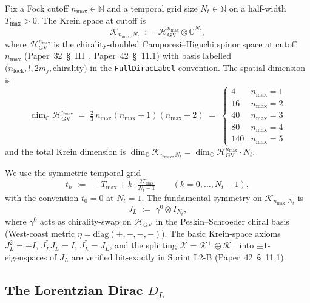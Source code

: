 \documentclass[11pt,a4paper]{article}
\theoremstyle{plain}
\theoremstyle{definition}
\newcommand{\nmax}{n_{\max}}
\newcommand{\Nt}{N_t}
\newcommand{\Krein}{\mathcal{K}}
\newcommand{\C}{\mathbb{C}}
\newcommand{\N}{\mathbb{N}}
\newcommand{\DL}{D_L}
\newcommand{\JL}{J_L}
\newcommand{\HGV}{\mathcal{H}_{\mathrm{GV}}}
\begin{document}
Fix a Fock cutoff $\nmax \in \N$ and a temporal grid size $\Nt \in
\N$ on a half-width $T_{\max} > 0$. The Krein space at cutoff is
\begin{equation}\label{eq:krein_def}
   \Krein_{\nmax, \Nt}
   \;:=\; \HGV^{\nmax} \otimes \C^{\Nt},
\end{equation}
where $\HGV^{\nmax}$ is the chirality-doubled Camporesi--Higuchi
spinor space at cutoff $\nmax$
(Paper~32~\S~III~\cite{paper32}, Paper~42~\S~11.1) with basis labelled
$\bigl(n_{\mathrm{fock}}, l, 2 m_j, \mathrm{chirality}\bigr)$ in the
\texttt{FullDiracLabel} convention. The spatial dimension is
\begin{equation}\label{eq:dim_spatial}
   \dim_\C \HGV^{\nmax}
   \;=\; \tfrac{2}{3}\,\nmax(\nmax + 1)(\nmax + 2)
   \;=\; \begin{cases} 4 & \nmax = 1 \\ 16 & \nmax = 2 \\
         40 & \nmax = 3 \\ 80 & \nmax = 4 \\ 140 & \nmax = 5 \end{cases}
\end{equation}
and the total Krein dimension is $\dim_\C \Krein_{\nmax, \Nt} =
\dim_\C \HGV^{\nmax} \cdot \Nt$.

We use the symmetric temporal grid
\begin{equation}\label{eq:t_grid}
   t_k \;:=\; -T_{\max} + k \cdot \tfrac{2 T_{\max}}{\Nt - 1}
   \qquad (k = 0, \ldots, \Nt - 1),
\end{equation}
with the convention $t_0 = 0$ at $\Nt = 1$. The fundamental symmetry
on $\Krein_{\nmax, \Nt}$ is
\begin{equation}\label{eq:J_def}
   \JL \;:=\; \gamma^0 \otimes I_{\Nt},
\end{equation}
where $\gamma^0$ acts as chirality-swap on $\HGV$ in the
Peskin--Schroeder chiral basis (West-coast metric $\eta =
\mathrm{diag}(+, -, -, -)$). The basic Krein-space axioms
$\JL^2 = +I$, $\JL^\dagger \JL = I$, $\JL^\dagger = \JL$, and the
splitting $\Krein = \Krein^+ \oplus \Krein^-$ into $\pm 1$-eigenspaces
of $\JL$ are verified bit-exactly in Sprint L2-B (Paper~42~\S~11.1).

\subsection{The Lorentzian Dirac $\DL$}\label{sec:lor_dirac}
\end{document}
